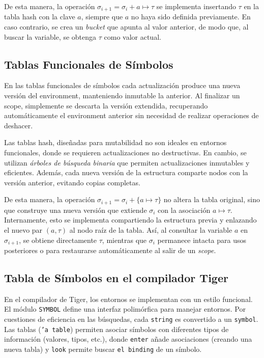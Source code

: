 \documentclass[runningheads]{llncs}
\begin{document}
De esta manera, la operación $\sigma_{i+1} = \sigma_i + {a \mapsto \tau}$ se implementa insertando $\tau$ en la tabla hash con la clave $a$, siempre que $a$ no haya sido definida previamente. En caso contrario, se crea un \textit{bucket} que apunta al valor anterior, de modo que, al buscar la variable, se obtenga $\tau$ como valor actual.

\subsection{Tablas Funcionales de Símbolos}
En las tablas funcionales de símbolos cada actualización produce una nueva versión del environment, manteniendo inmutable la anterior. Al finalizar un scope, simplemente se descarta la versión extendida, recuperando automáticamente el environment anterior sin necesidad de realizar operaciones de deshacer.

Las tablas hash, diseñadas para mutabilidad no son ideales en entornos funcionales, donde se requieren actualizaciones no destructivas. En cambio, se utilizan \textit{árboles de búsqueda binaria} que permiten actualizaciones inmutables y eficientes. Además, cada nueva versión de la estructura comparte nodos con la versión anterior, evitando copias completas.

De esta manera, la operación $\sigma_{i+1} = \sigma_i + \{a \mapsto \tau\}$ no altera la tabla original, sino que construye una nueva versión que extiende $\sigma_i$ con la asociación $a \mapsto \tau$. Internamente, esto se implementa compartiendo la estructura previa y enlazando el nuevo par $(a,\tau)$ al nodo raíz de la tabla. Así, al consultar la variable $a$ en $\sigma_{i+1}$, se obtiene directamente $\tau$, mientras que $\sigma_i$ permanece intacta para usos posteriores o para restaurarse automáticamente al salir de un \textit{scope}.

\subsection{Tabla de Símbolos en el compilador Tiger}
En el compilador de Tiger, los entornos se implementan con un estilo funcional. El módulo \texttt{SYMBOL} define una interfaz polimórfica para manejar entornos. Por cuestiones de eficiencia en las búsquedas, cada \texttt{string} es convertido a un \texttt{symbol}. Las tablas (\texttt{'a table}) permiten asociar símbolos con diferentes tipos de información (valores, tipos, etc.), donde \texttt{enter} añade asociaciones (creando una nueva tabla) y \texttt{look} permite buscar \texttt{el binding} de un símbolo.
\end{document}
